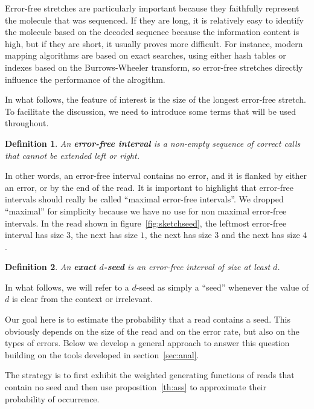 \documentclass{article}
\newtheorem{definition}{Definition}
\begin{document}
Error-free stretches are particularly important because they faithfully
represent the molecule that was sequenced. If they are long, it is
relatively easy to identify the molecule based on the decoded sequence
because the information content is high, but if they are short, it usually
proves more difficult. For instance, modern mapping algorithms are based
on exact searches, using either hash tables or indexes based on the
Burrows-Wheeler transform, so error-free stretches directly influence the
performance of the alrogithm.

In what follows, the feature of interest is the size of the longest
error-free stretch. To facilitate the discussion, we need to introduce
some terms that will be used throughout.

\begin{definition}
\label{def:error-free-interval}
An \textbf{error-free interval} is a non-empty sequence of correct calls
that cannot be extended left or right.
\end{definition}

In other words, an error-free interval contains no error, and it is
flanked by either an error, or by the end of the read. It is important to
highlight that error-free intervals should really be called ``maximal
error-free intervals''. We dropped ``maximal'' for simplicity because we
have no use for non maximal error-free intervals. In the read shown in
figure~\ref{fig:sketchseed}, the leftmost error-free interval has size
$3$, the next has size $1$, the next has size $3$ and the next has size
$4$.

\begin{definition}
\label{def:seed}
An \textbf{exact $d$-seed} is an error-free interval of size at least $d$.
\end{definition}

In what follows, we will refer to a $d$-seed as simply a ``seed''
whenever the value of $d$ is clear from the context or irrelevant.

Our goal here is to estimate the probability that a read contains a seed.
This obviously depends on the size of the read and on the error rate, but
also on the types of errors. Below we develop a general approach to answer
this question building on the tools developed in
section~\ref{sec:anal}.

The strategy is to first exhibit the weighted generating functions of
reads that contain no seed and then use proposition~\ref{th:ass} to
approximate their probability of occurrence.
\end{document}
